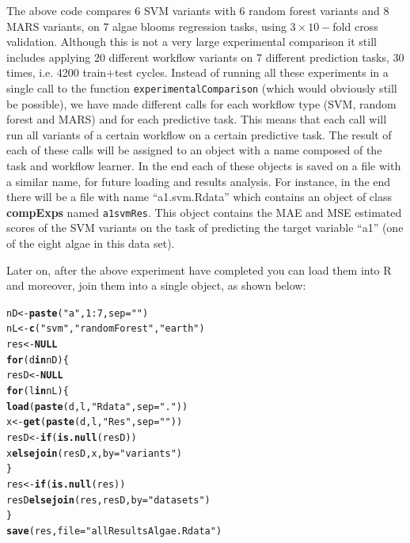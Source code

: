 \documentclass[10pt,a4paper]{article}\usepackage[]{graphicx}\usepackage[]{color}
\makeatletter
\newcommand{\hlnum}[1]{\textcolor[rgb]{0.686,0.059,0.569}{#1}}%
\newcommand{\hlstr}[1]{\textcolor[rgb]{0.192,0.494,0.8}{#1}}%
\newcommand{\hlopt}[1]{\textcolor[rgb]{0,0,0}{#1}}%
\newcommand{\hlstd}[1]{\textcolor[rgb]{0.345,0.345,0.345}{#1}}%
\newcommand{\hlkwa}[1]{\textcolor[rgb]{0.161,0.373,0.58}{\textbf{#1}}}%
\newcommand{\hlkwb}[1]{\textcolor[rgb]{0.69,0.353,0.396}{#1}}%
\newcommand{\hlkwc}[1]{\textcolor[rgb]{0.333,0.667,0.333}{#1}}%
\newcommand{\hlkwd}[1]{\textcolor[rgb]{0.737,0.353,0.396}{\textbf{#1}}}%
\newenvironment{kframe}{%
 \def\at@end@of@kframe{}%
 \ifinner\ifhmode%
  \def\at@end@of@kframe{\end{minipage}}%
  \begin{minipage}{\columnwidth}%
 \fi\fi%
 \def\FrameCommand##1{\hskip\@totalleftmargin \hskip-\fboxsep
 \colorbox{shadecolor}{##1}\hskip-\fboxsep
     \hskip-\linewidth \hskip-\@totalleftmargin \hskip\columnwidth}%
 \MakeFramed {\advance\hsize-\width
   \@totalleftmargin\z@ \linewidth\hsize
   \@setminipage}}%
 {\par\unskip\endMakeFramed%
 \at@end@of@kframe}
\newenvironment{knitrout}{}{} %
\makeatother
\begin{document}
The above code compares 6 SVM variants with 6 random forest variants
and 8 MARS variants, on 7 algae blooms regression tasks, using
$3\times 10-$fold cross validation. Although this is not a very large
experimental comparison it still includes applying 20 different
workflow variants on 7 different prediction tasks, 30 times, i.e. 4200
train+test cycles. Instead of running all these experiments in a
single call to the function \texttt{experimentalComparison} (which
would obviously still be possible), we have made different calls for
each workflow type (SVM, random forest and MARS) and for each
predictive task. This means that each call will run all variants of a
certain workflow on a certain predictive task. The result of each of
these calls will be assigned to an object with a name composed of the
task and workflow learner. In the end each of these objects is saved
on a file with a similar name, for future loading and results
analysis. For instance, in the end there will be a file with name
``a1.svm.Rdata'' which contains an object of class \textbf{compExps}
named \texttt{a1svmRes}. This object contains the MAE and MSE
estimated scores of the SVM variants on the task of predicting the
target variable ``a1'' (one of the eight algae in this data set).

Later on, after the above experiment have completed you can load them
into R and moreover, join them into a single object, as shown below:

\begin{knitrout}
\color{fgcolor}\begin{kframe}
\begin{alltt}
\hlstd{nD} \hlkwb{<-} \hlkwd{paste}\hlstd{(}\hlstr{"a"}\hlstd{,} \hlnum{1}\hlopt{:}\hlnum{7}\hlstd{,} \hlkwc{sep} \hlstd{=} \hlstr{""}\hlstd{)}
\hlstd{nL} \hlkwb{<-} \hlkwd{c}\hlstd{(}\hlstr{"svm"}\hlstd{,} \hlstr{"randomForest"}\hlstd{,} \hlstr{"earth"}\hlstd{)}
\hlstd{res} \hlkwb{<-} \hlkwa{NULL}
\hlkwa{for} \hlstd{(d} \hlkwa{in} \hlstd{nD) \{}
    \hlstd{resD} \hlkwb{<-} \hlkwa{NULL}
    \hlkwa{for} \hlstd{(l} \hlkwa{in} \hlstd{nL) \{}
        \hlkwd{load}\hlstd{(}\hlkwd{paste}\hlstd{(d, l,} \hlstr{"Rdata"}\hlstd{,} \hlkwc{sep} \hlstd{=} \hlstr{"."}\hlstd{))}
        \hlstd{x} \hlkwb{<-} \hlkwd{get}\hlstd{(}\hlkwd{paste}\hlstd{(d, l,} \hlstr{"Res"}\hlstd{,} \hlkwc{sep} \hlstd{=} \hlstr{""}\hlstd{))}
        \hlstd{resD} \hlkwb{<-} \hlkwa{if} \hlstd{(}\hlkwd{is.null}\hlstd{(resD))}
            \hlstd{x} \hlkwa{else} \hlkwd{join}\hlstd{(resD, x,} \hlkwc{by} \hlstd{=} \hlstr{"variants"}\hlstd{)}
    \hlstd{\}}
    \hlstd{res} \hlkwb{<-} \hlkwa{if} \hlstd{(}\hlkwd{is.null}\hlstd{(res))}
        \hlstd{resD} \hlkwa{else} \hlkwd{join}\hlstd{(res, resD,} \hlkwc{by} \hlstd{=} \hlstr{"datasets"}\hlstd{)}
\hlstd{\}}
\hlkwd{save}\hlstd{(res,} \hlkwc{file} \hlstd{=} \hlstr{"allResultsAlgae.Rdata"}\hlstd{)}
\end{alltt}
\end{kframe}
\end{knitrout}
\end{document}
